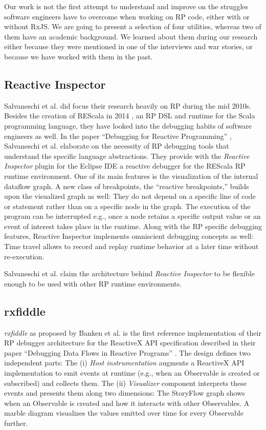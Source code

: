 \documentclass[12pt,a4paper]{article}
\begin{document}
Our work is not the first attempt to understand and improve on the struggles software engineers have to overcome when working on RP code, either with or without RxJS. We are going to present a selection of four utilities, whereas two of them have an academic background. We learned about them during our research either because they were mentioned in one of the interviews and war stories, or because we have worked with them in the past.

\subsection{Reactive Inspector}

Salvaneschi et al. did focus their research heavily on RP during the mid 2010s. Besides the creation of REScala in 2014 \cite{10.1145/2577080.2577083}, an RP DSL and runtime for the Scala programming language, they have looked into the debugging habits of software engineers as well. In the paper ``Debugging for Reactive Programming'' \cite{10.1145/2884781.2884815}, Salvaneschi et al. elaborate on the necessity of RP debugging tools that understand the specific language abstractions. They provide with the \emph{Reactive Inspector} plugin for the Eclipse IDE a reactive debugger for the REScala RP runtime environment. One of its main features is the visualization of the internal dataflow graph. A new class of  breakpoints, the ``reactive breakpoints,'' builds upon the visualized graph as well: They do not depend on a specific line of code or statement rather than on a specific node in the graph. The execution of the program can be interrupted e.g., once a node retains a specific output value or an event of interest takes place in the runtime. Along with the RP specific debugging features, Reactive Inspector implements omniscient debugging concepts as well: Time travel allows to record and replay runtime behavior at a later time without re-execution.

Salvaneschi et al. claim\cite{10.1145/2577080.2577083} the architecture behind \emph{Reactive Inspector} to be flexible enough to be used with other RP runtime environments.

\subsection{rxfiddle}

\emph{rxfiddle} as proposed by Banken et al. is the first reference implementation of their RP debugger architecture for the ReactiveX API specification described in their paper ``Debugging Data Flows in Reactive Programs'' \cite{10.1145/3180155.3180156}. The design defines two independent parts: The (i) \emph{Host instrumentation} augments a ReactiveX API implementation to emit events at runtime (e.g., when an Observable is created or subscribed) and collects them. The (ii) \emph{Visualizer} component interprets these events and presents them along two dimensions: The StoryFlow graph \cite{YWu2013a} shows when an Observable is created and how it interacts with other Observables. A marble diagram visualizes the values emitted over time for every Observable further.
\end{document}
